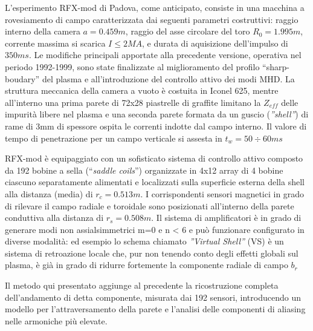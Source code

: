 L'esperimento RFX-mod di Padova, come anticipato, consiste in una
macchina a rovesiamento di campo caratterizzata dai seguenti parametri
costruttivi: raggio interno della camera $a=0.459m$, raggio del asse
circolare del toro $R_0 = 1.995m$, corrente massima si scarica
$I\leq2MA$, e durata di aquisizione dell'impulso di $350ms$.  Le
modifiche principali apportate alla precedente versione, operativa nel
periodo 1992-1999, sono state finalizzate al miglioramento del profilo
``sharp-boudary'' del plasma e all'introduzione del controllo attivo dei
modi MHD.  La struttura meccanica della camera a vuoto è costuita in
Iconel 625, mentre all'interno una prima parete di 72x28 piastrelle di
graffite limitano la $Z_{eff}$ delle impurità libere nel plasma e una
seconda parete formata da un guscio (\emph{''shell''}) di rame di 3mm di
spessore ospita le correnti indotte dal campo interno. Il valore di
tempo di penetrazione per un campo verticale si assesta in $t_w = 50
\div 60 ms$ \cite{pizz75}

RFX-mod è equipaggiato con un sofisticato sistema di controllo attivo
composto da 192 bobine a sella (``\emph{saddle coils}'') organizzate in
4x12 array di 4 bobine ciascuno separatamente alimentati e localizzati
sulla superficie esterna della shell alla distanza (media) di $r_c =
0.513m$. I corrispondenti sensori magnetici in grado di rilevare il
campo radiale e toroidale sono posizionati all'interno della parete
conduttiva alla distanza di $r_s = 0.508m$.  Il sistema di amplificatori
è in grado di generare modi non assialsimmetrici m=0 e n < 6 e può
funzionare configurato in diverse modalità: ed esempio lo schema
chiamato \emph{''Virtual Shell''} (VS) è un sistema di retroazione
locale che, pur non tenendo conto degli effetti globali sul plasma, è
già in grado di ridurre fortemente la componente radiale di campo
$b_r$\cite{pizz78}\cite{pizz79}

Il metodo qui presentato aggiunge al precedente la ricostruzione
completa dell'andamento di detta componente, misurata dai 192 sensori,
introducendo un modello per l'attraversamento della parete e l'analisi
delle componenti di aliasing nelle armoniche più elevate.

